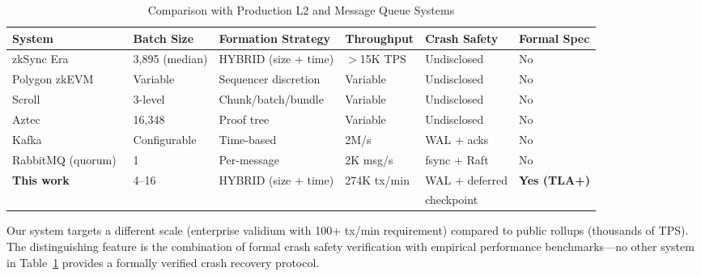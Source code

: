 \begin{table}[t]
\centering
\caption{Comparison with Production L2 and Message Queue Systems}
\label{tab:comparison}
\begin{tabular}{llllll}
\toprule
\textbf{System} & \textbf{Batch Size} & \textbf{Formation Strategy} & \textbf{Throughput} & \textbf{Crash Safety} & \textbf{Formal Spec} \\
\midrule
zkSync Era~\cite{chaliasos2024analyzing}          & 3,895 (median) & HYBRID (size + time) & $>$15K TPS & Undisclosed    & No  \\
Polygon zkEVM~\cite{chaliasos2024analyzing}       & Variable       & Sequencer discretion & Variable   & Undisclosed    & No  \\
Scroll~\cite{scroll2025architecture}              & 3-level        & Chunk/batch/bundle   & Variable   & Undisclosed    & No  \\
Aztec~\cite{aztec2025ignition}                    & 16,348         & Proof tree           & Variable   & Undisclosed    & No  \\
Kafka~\cite{linkedin2024kafka}                    & Configurable   & Time-based           & 2M/s       & WAL + acks     & No  \\
RabbitMQ (quorum)~\cite{softwaremill2020mq}       & 1              & Per-message          & 2K msg/s   & fsync + Raft   & No  \\
\textbf{This work}                                & 4--16          & HYBRID (size + time) & 274K tx/min& WAL + deferred & \textbf{Yes (TLA+)} \\
                                                  &                &                      &            & checkpoint     & \\
\bottomrule
\end{tabular}
\end{table}

Our system targets a different scale (enterprise validium with 100+ tx/min
requirement) compared to public rollups (thousands of TPS). The distinguishing
feature is the combination of formal crash safety verification with empirical
performance benchmarks---no other system in Table~\ref{tab:comparison} provides
a formally verified crash recovery protocol.
